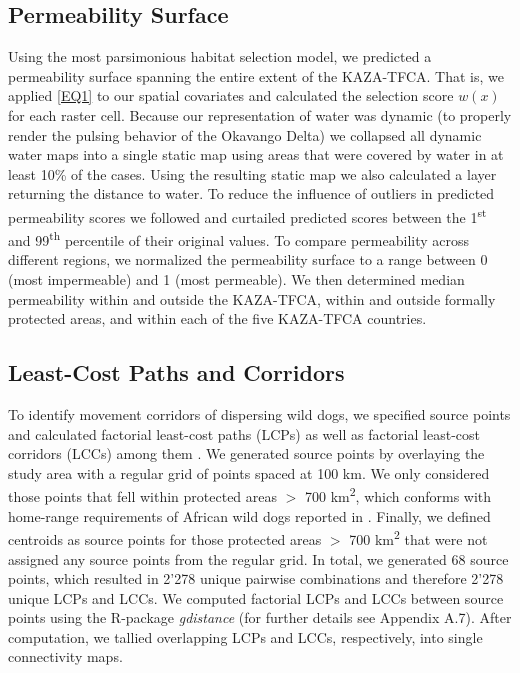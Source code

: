 \documentclass[abstract=on,10pt,a4paper,bibliography=totocnumbered]{article}
\begin{document}
\subsection{Permeability Surface}
Using the most parsimonious habitat selection model, we predicted a permeability
surface spanning the entire extent of the KAZA-TFCA. That is, we applied
\ref{EQ1} to our spatial covariates and calculated the selection score \(w(x)\)
for each raster cell. Because our representation of water was dynamic (to
properly render the pulsing behavior of the Okavango Delta) we collapsed all
dynamic water maps into a single static map using areas that were covered by
water in at least 10\% of the cases. Using the resulting static map we also
calculated a layer returning the distance to water. To reduce the influence of
outliers in predicted permeability scores we followed \cite{Squires.2013} and
curtailed predicted scores between the 1\textsuperscript{st} and
99\textsuperscript{th} percentile of their original values. To compare
permeability across different regions, we normalized the permeability surface to
a range between 0 (most impermeable) and 1 (most permeable). We then determined
median permeability within and outside the KAZA-TFCA, within and outside
formally protected areas, and within each of the five KAZA-TFCA countries.

\subsection{Least-Cost Paths and Corridors}
To identify movement corridors of dispersing wild dogs, we specified source
points and calculated factorial least-cost paths (LCPs) as well as factorial
least-cost corridors (LCCs) among them \citep{Elliot.2014}. We generated source
points by overlaying the study area with a regular grid of points spaced at 100
km. We only considered those points that fell within protected areas \(>\) 700
km\textsuperscript{2}, which conforms with home-range requirements of African
wild dogs reported in \cite{Pomilia.2015}. Finally, we defined centroids as
source points for those protected areas \(>\) 700 km\textsuperscript{2} that
were not assigned any source points from the regular grid. In total, we
generated 68 source points, which resulted in 2'278 unique pairwise combinations
and therefore 2'278 unique LCPs and LCCs. We computed factorial LCPs and LCCs
between source points using the R-package \textit{gdistance} (for further
details see Appendix A.7). After computation, we tallied overlapping LCPs and
LCCs, respectively, into single connectivity maps.
\end{document}
